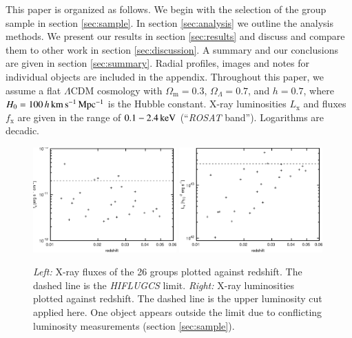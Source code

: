 \documentclass[structabstract]{aa}
\begin{document}
This paper is organized as follows. We begin with the selection of the group
sample in section \ref{sec:sample}. In section \ref{sec:analysis} we outline
the analysis methods. We present our results in section \ref{sec:results} and
discuss and compare them to other work in section \ref{sec:discussion}. A
summary and our conclusions are given in section \ref{sec:summary}. Radial
profiles, images and notes for individual objects are included in the
appendix. Throughout this paper, we assume a flat $\Lambda$CDM cosmology with
$\Omega_{\text{m}}=0.3$, $\Omega_{\Lambda}=0.7$, and $h=0.7$, where
$H_{0}=\unit[100\,h]{km\,s^{-1}\,Mpc^{-1}}$ is the Hubble constant. X-ray
luminosities $L_{\text{x}}$ and fluxes $f_{\text{x}}$ are given in the range
of $\unit[0.1-2.4]{keV}$ (``\emph{ROSAT} band''). Logarithms are decadic.
%
%
%
\begin{figure}[!htbp]
	\centering
		\includegraphics[width=0.49\textwidth]{fz.eps}\quad
		\includegraphics[width=0.49\textwidth]{lz.eps}\quad
	\caption{\emph{Left:} X-ray fluxes of the 26 groups plotted against
          redshift. The dashed line is the \emph{HIFLUGCS}
          limit. \emph{Right:} X-ray luminosities plotted against redshift. The
          dashed line is the upper luminosity cut applied here. One object
          appears outside the limit due to conflicting luminosity measurements
          (section \ref{sec:sample}).}
	\label{fig:lz}
\end{figure}
%
\end{document}
